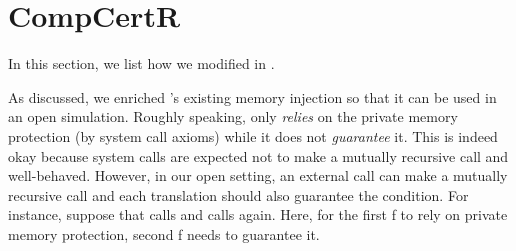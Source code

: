 \section{CompCertR}
\label{sec:compiler:compcertr}

In this section, we list how we modified \cc{} in \ccr{}.

As discussed, we enriched \cc{}'s existing memory injection so that it can be used in an open simulation.
Roughly speaking, \cc{} only \emph{relies} on the private memory protection (by system call axioms) while it does not \emph{guarantee} it.
This is indeed okay because system calls are expected not to make a mutually recursive call and well-behaved.
However, in our open setting, an external call can make a mutually recursive call and each translation should also guarantee the condition.
For instance, suppose that  calls  and  calls  again.
Here, for the first f to rely on private memory protection, second f needs to guarantee it.





